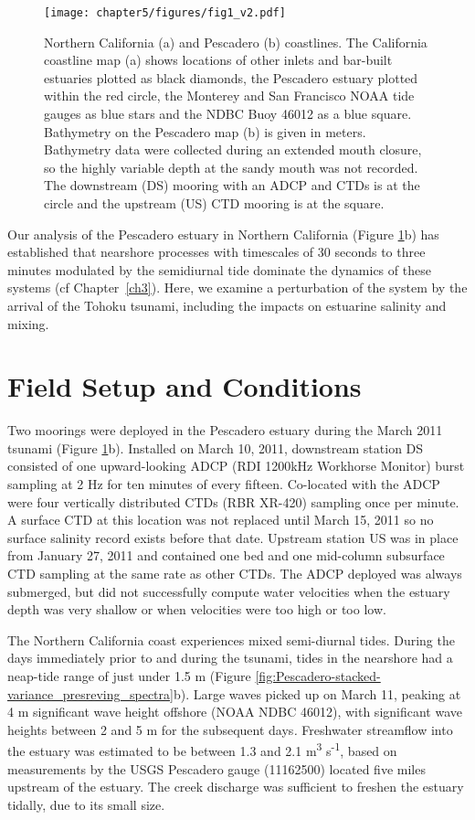 \begin{figure}
\texttt{[image: chapter5/figures/fig1\_v2.pdf]}\protect\caption{Northern California (a) and Pescadero (b) coastlines. The California
coastline map (a) shows locations of other inlets and bar-built estuaries
plotted as black diamonds, the Pescadero estuary plotted within the
red circle, the Monterey and San Francisco NOAA tide gauges as blue
stars and the NDBC Buoy 46012 as a blue square. Bathymetry on the
Pescadero map (b) is given in meters. Bathymetry data were collected
during an extended mouth closure, so the highly variable depth at
the sandy mouth was not recorded. The downstream (DS) mooring with
an ADCP and CTDs is at the circle and the upstream (US) CTD mooring
is at the square. \label{fig:coastline_map_with_inlets}}
\end{figure}

Our analysis of the Pescadero estuary in Northern California (Figure
\ref{fig:coastline_map_with_inlets}b) has established that nearshore
processes with timescales of 30 seconds to three minutes modulated
by the semidiurnal tide dominate the dynamics of these systems (cf Chapter~\ref{ch3}).
Here, we examine a perturbation of the system by the arrival of the
Tohoku tsunami, including the impacts on estuarine salinity and mixing. 


\section{Field Setup and Conditions}

Two moorings were deployed in the Pescadero estuary during the March
2011 tsunami (Figure \ref{fig:coastline_map_with_inlets}b). Installed
on March 10, 2011, downstream station DS consisted of one upward-looking
ADCP (RDI 1200kHz Workhorse Monitor) burst sampling at 2 Hz for ten
minutes of every fifteen. Co-located with the ADCP were four vertically
distributed CTDs (RBR XR-420) sampling once per minute. A surface
CTD at this location was not replaced until March 15, 2011 so no surface
salinity record exists before that date. Upstream station US was in
place from January 27, 2011 and contained one bed and one mid-column
subsurface CTD sampling at the same rate as other CTDs. The ADCP deployed
was always submerged, but did not successfully compute water velocities
when the estuary depth was very shallow or when velocities were too
high\emph{ }or too low. 

The Northern California coast experiences mixed semi-diurnal tides.
During the days immediately prior to and during the tsunami, tides
in the nearshore had a neap-tide range of just under\emph{ }1.5 m
(Figure \ref{fig:Pescadero-stacked-variance_presreving_spectra}b).
Large waves picked up on March 11, peaking at 4 m significant wave
height offshore (NOAA NDBC 46012), with significant wave heights between
2 and 5 m for the subsequent days\emph{. }Freshwater streamflow into
the estuary was estimated to be between 1.3 and 2.1 m\textsuperscript{3}
s\textsuperscript{-1}, based on measurements by the USGS Pescadero
gauge (11162500) located five miles upstream of the estuary.\emph{
}The creek discharge was sufficient to freshen the estuary tidally,
due to its small size. 

